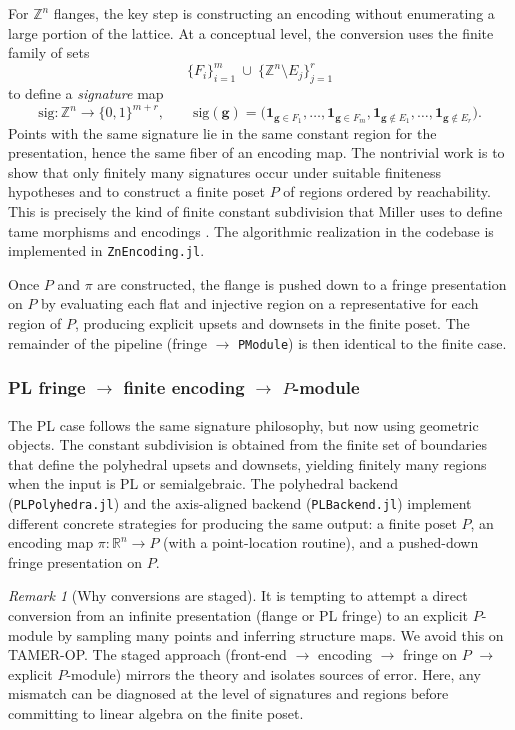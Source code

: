 \documentclass{article}
\newcommand{\<}{\langle}
\renewcommand{\>}{\rangle}
\theoremstyle{definition}
\theoremstyle{remark}
\newtheorem*{remark}{Remark}
\begin{document}
	For $\mathbb{Z}^n$ flanges, the key step is constructing an encoding without enumerating a large portion of the lattice.
	At a conceptual level, the conversion uses the finite family of sets
	\[
	\{F_i\}_{i=1}^m \ \cup\ \{\mathbb{Z}^n\setminus E_j\}_{j=1}^r
	\]
	to define a \emph{signature} map
	\[
	\mathrm{sig}\colon \mathbb{Z}^n \longrightarrow \{0,1\}^{m+r},
	\qquad
	\mathrm{sig}(\mathbf{g}) = \big( \mathbf{1}_{\mathbf{g}\in F_1},\dots,\mathbf{1}_{\mathbf{g}\in F_m},
	\mathbf{1}_{\mathbf{g}\notin E_1},\dots,\mathbf{1}_{\mathbf{g}\notin E_r}\big).
	\]
	Points with the same signature lie in the same constant region for the presentation, hence the same fiber of an
	encoding map.  The nontrivial work is to show that only finitely many signatures occur under suitable finiteness
	hypotheses and to construct a finite poset $P$ of regions ordered by reachability.  This is precisely the kind of
	finite constant subdivision that Miller uses to define tame morphisms and encodings \cite{Mil20}.  The algorithmic
	realization in the codebase is implemented in \texttt{ZnEncoding.jl}.
	
	Once $P$ and $\pi$ are constructed, the flange is pushed down to a fringe presentation on $P$ by evaluating each flat
	and injective region on a representative for each region of $P$, producing explicit upsets and downsets in the finite
	poset.  The remainder of the pipeline (fringe $\to$ \texttt{PModule}) is then identical to the finite case.
	
	\subsubsection*{PL fringe $\to$ finite encoding $\to$ $P$-module}
	
	The PL case follows the same signature philosophy, but now using geometric objects.  The constant subdivision is obtained from the finite set of boundaries that define the polyhedral upsets and downsets, yielding finitely many regions when the input is PL or semialgebraic.  The polyhedral backend (\texttt{PLPolyhedra.jl}) and the axis-aligned backend (\texttt{PLBackend.jl}) implement different concrete strategies for producing the same output: a finite poset $P$, an encoding map $\pi\colon \mathbb{R}^n\to P$ (with a point-location routine), and a pushed-down fringe presentation on $P$.
	
	\begin{remark}[Why conversions are staged]
		It is tempting to attempt a direct conversion from an infinite presentation (flange or PL fringe) to an explicit
		$P$-module by sampling many points and inferring structure maps.  We avoid this on TAMER-OP.  The staged approach (front-end $\to$ encoding $\to$ fringe on $P$ $\to$ explicit $P$-module) mirrors the theory and isolates sources of error. Here, any mismatch can be diagnosed at the level of signatures and regions before committing to linear algebra on the finite poset.
	\end{remark}
	
\end{document}
